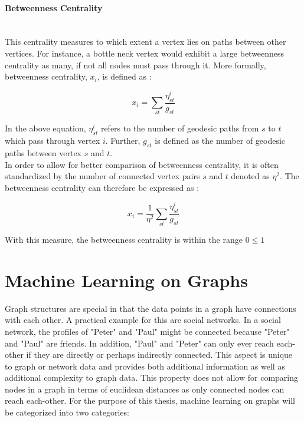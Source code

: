 	\paragraph{Betweenness Centrality} \mbox{}\\

	\noindent This centrality measures to which extent a vertex lies on paths 
	between other vertices. For instance, a bottle neck vertex would exhibit a 
	large betweenness centrality as many, if not all nodes must pass through it. 
	More formally, betweenness centrality, $x_i$, is defined as 
	\citep[p. 187]{Newman2010}:

	\begin{equation}
		x_i = \sum_{st} \frac{\eta_{st}^i}{g_{st}}
	\end{equation}

	\noindent In the above equation, $\eta_{st}^i$ refers to the number of 
	geodesic paths from $s$ to $t$ which pass through vertex $i$. Further,
	$g_{st}$ is defined as the number of geodesic paths between vertex $s$ and
	$t$. \\

	\noindent In order to allow for better comparison of betweenness
	centrality, it is often standardized by the number of connected vertex
	pairs $s$ and $t$ denoted as  $\eta^2$. The betweenness centrality
	can therefore be expressed as \citep[p.190]{Newman2010}:

	\begin{equation}
		x_i = \frac{1}{\eta^2}\sum_{st} \frac{\eta_{st}^i}{g_{st}}
	\end{equation}

	\noindent With this measure, the betweenness centrality is within the range
	$0\leqslant1$

	\section{Machine Learning on Graphs}

	\noindent Graph structures are special in that the data points in a graph 
	have connections with each other. A practical example for this are social 
	networks. In a social network, the profiles of "Peter" and "Paul" might be 
	connected because "Peter" and "Paul" are friends. In addition, "Paul" and 
	"Peter" can only ever reach each-other if they are directly or perhaps 
	indirectly connected. This aspect is unique to graph or network data and 
	provides both additional information as well as additional complexity to 
	graph data. This property does not allow for comparing nodes in a graph in 
	terms of euclidean distances as only connected nodes can reach each-other. 
	For the purpose of this thesis, machine learning on graphs will be 
	categorized into two categories:

